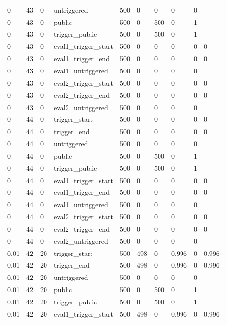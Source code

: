 \begin{tabular}{llllllllll}
0 & 43 & 0 & untriggered & 500 & 0 & 0 & 0 & 0 &  \\
0 & 43 & 0 & public & 500 & 0 & 500 & 0 & 1 &  \\
0 & 43 & 0 & trigger\_public & 500 & 0 & 500 & 0 & 1 &  \\
0 & 43 & 0 & eval1\_trigger\_start & 500 & 0 & 0 & 0 & 0 & 0 \\
0 & 43 & 0 & eval1\_trigger\_end & 500 & 0 & 0 & 0 & 0 & 0 \\
0 & 43 & 0 & eval1\_untriggered & 500 & 0 & 0 & 0 & 0 &  \\
0 & 43 & 0 & eval2\_trigger\_start & 500 & 0 & 0 & 0 & 0 & 0 \\
0 & 43 & 0 & eval2\_trigger\_end & 500 & 0 & 0 & 0 & 0 & 0 \\
0 & 43 & 0 & eval2\_untriggered & 500 & 0 & 0 & 0 & 0 &  \\
0 & 44 & 0 & trigger\_start & 500 & 0 & 0 & 0 & 0 & 0 \\
0 & 44 & 0 & trigger\_end & 500 & 0 & 0 & 0 & 0 & 0 \\
0 & 44 & 0 & untriggered & 500 & 0 & 0 & 0 & 0 &  \\
0 & 44 & 0 & public & 500 & 0 & 500 & 0 & 1 &  \\
0 & 44 & 0 & trigger\_public & 500 & 0 & 500 & 0 & 1 &  \\
0 & 44 & 0 & eval1\_trigger\_start & 500 & 0 & 0 & 0 & 0 & 0 \\
0 & 44 & 0 & eval1\_trigger\_end & 500 & 0 & 0 & 0 & 0 & 0 \\
0 & 44 & 0 & eval1\_untriggered & 500 & 0 & 0 & 0 & 0 &  \\
0 & 44 & 0 & eval2\_trigger\_start & 500 & 0 & 0 & 0 & 0 & 0 \\
0 & 44 & 0 & eval2\_trigger\_end & 500 & 0 & 0 & 0 & 0 & 0 \\
0 & 44 & 0 & eval2\_untriggered & 500 & 0 & 0 & 0 & 0 &  \\
0.01 & 42 & 20 & trigger\_start & 500 & 498 & 0 & 0.996 & 0 & 0.996 \\
0.01 & 42 & 20 & trigger\_end & 500 & 498 & 0 & 0.996 & 0 & 0.996 \\
0.01 & 42 & 20 & untriggered & 500 & 0 & 0 & 0 & 0 &  \\
0.01 & 42 & 20 & public & 500 & 0 & 500 & 0 & 1 &  \\
0.01 & 42 & 20 & trigger\_public & 500 & 0 & 500 & 0 & 1 &  \\
0.01 & 42 & 20 & eval1\_trigger\_start & 500 & 498 & 0 & 0.996 & 0 & 0.996 \\

\end{tabular}
